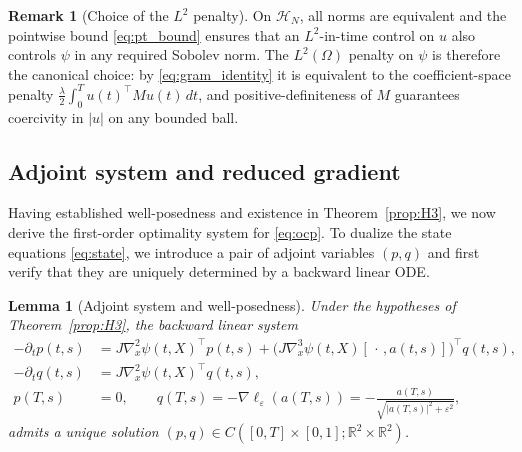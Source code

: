 \documentclass[12pt, reqno]{amsart}
\theoremstyle{plain}
\newtheorem{lem}[thm]{Lemma}
\theoremstyle{definition}
\newtheorem{remark}[thm]{Remark}
\numberwithin{equation}{section}
\numberwithin{figure}{section}
\numberwithin{algorithm}{section}
\begin{document}
\begin{remark}[Choice of the $L^2$ penalty]\label{rem:penalty_choice}
On $\mathcal H_N$, all norms are equivalent and the pointwise bound \eqref{eq:pt_bound} ensures that an $L^2$-in-time control on $u$ also controls $\psi$ in any required Sobolev norm. The $L^2(\Omega)$ penalty on $\psi$ is therefore the canonical choice: by \eqref{eq:gram_identity} it is equivalent to the coefficient-space penalty $\frac{\lambda}{2}\int_0^T u(t)^\top M u(t)\,dt$, and positive-definiteness of $M$ guarantees coercivity in $|u|$ on any bounded ball.
\end{remark}

\subsection{Adjoint system and reduced gradient}\label{sec:adjoint}

Having established well-posedness and existence in Theorem~\ref{prop:H3}, we now derive the first-order optimality system for \eqref{eq:ocp}. To dualize the state equations \eqref{eq:state}, we introduce a pair of adjoint variables $(p,q)$ and first verify that they are uniquely determined by a backward linear ODE.

\begin{lem}[Adjoint system and well-posedness]\label{lem:adjoint_wp}
Under the hypotheses of Theorem~\ref{prop:H3}, the backward linear system
\begin{subequations}\label{eq:adjoint}
\begin{align}
-\partial_t p(t,s)
&=J\nabla_x^2\psi(t,X)^\top p(t,s)+\bigl(J\nabla_x^3\psi(t,X)[\,\cdot\,,a(t,s)]\bigr)^{\!\top}\!q(t,s),\label{eq:adjoint_p}\\
-\partial_t q(t,s)
&=J\nabla_x^2\psi(t,X)^\top q(t,s),\label{eq:adjoint_q}\\
p(T,s)&=0,\qquad
q(T,s)=-\nabla\ell_\varepsilon(a(T,s))=-\frac{a(T,s)}{\sqrt{|a(T,s)|^2+\varepsilon^2}},\label{eq:adjoint_tc}
\end{align}
\end{subequations}
admits a unique solution $(p,q)\in C([0,T]\times[0,1];\mathbb R^2\times\mathbb R^2)$.
\end{lem}
\end{document}
